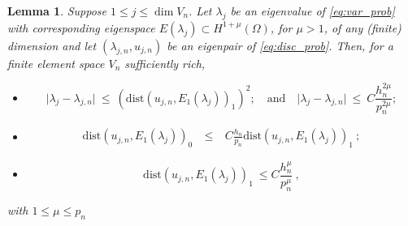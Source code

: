 \documentclass[preprint ,12pt]{elsarticle}
\newtheorem{lemma}[theorem]{Lemma}
\begin{document}
\begin{lemma}
\label{lm:adj}
Suppose  $ 1 \leq j\leq \dim V_n$. Let
$\lambda_j$ be an eigenvalue   of \eqref{eq:var_prob} with
corresponding eigenspace $E(\lambda_j)\subset H^{1+\mu}(\Omega)$, for $\mu>1$, of any (finite) dimension  and
let $(\lambda_{j,n},u_{j,n})$ be an  eigenpair  of \eqref{eq:disc_prob}.
Then, for a finite element space $V_n$ sufficiently rich,
\begin{itemize}
\item[(i)] 
\begin{equation}
\vert \lambda_j - \lambda_{j,n} \vert \ \leq \ (\mathrm{dist}(
u_{j,n},E_1(\lambda_j))_{1})^2; \quad \text{and} \quad
\vert \lambda_j - \lambda_{j,n} \vert \ \leq \ C
\frac{h_n^{2\mu} }{p_n^{2\mu}};  \label{eq:supereig}
\end{equation}
\item[(ii)] 
\begin{eqnarray}
\mathrm{dist}(
u_{j,n},E_1(\lambda_j))_{0}\ & \leq& \ C \frac{h_n}{p_n}
 \mathrm{dist}(
u_{j,n},E_1(\lambda_j))_{1} \ ; \label{eq:adj}
\end{eqnarray}
\item[(iii)]
\begin{equation}
\label{eq:energy} \mathrm{dist}(
u_{j,n},E_1(\lambda_j))_{1} \ \leq
C \frac{h_n^{\mu}}{p_n^{\mu}}\ , 
\end{equation}
\end{itemize}
with $1\leq \mu\leq p_n$
\end{lemma}
\end{document}
